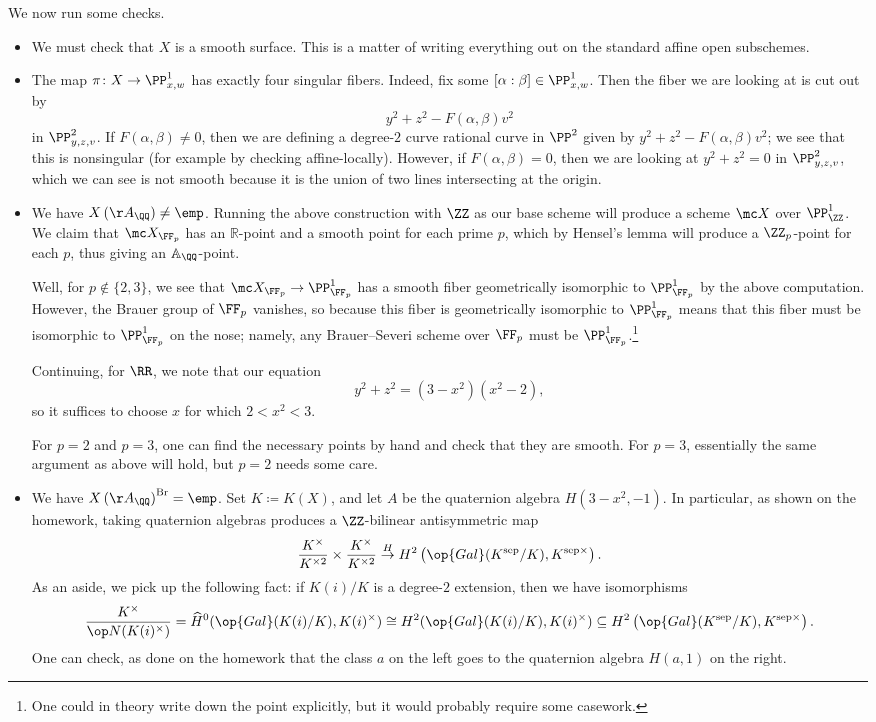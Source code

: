 \documentclass[../notes.tex]{subfiles}
\begin{document}
We now run some checks.
\begin{itemize}
	\item We must check that $X$ is a smooth surface. This is a matter of writing everything out on the standard affine open subschemes.
	\item The map $\pi\colon X\to\PP^1_{x,w}$ has exactly four singular fibers. Indeed, fix some $[\alpha:\beta]\in\PP^1_{x,w}$. Then the fiber we are looking at is cut out by
	\[y^2+z^2-F(\alpha,\beta)v^2\]
	in $\PP^2_{y,z,v}$. If $F(\alpha,\beta)\ne0$, then we are defining a degree-$2$ curve rational curve in $\PP^2$ given by $y^2+z^2-F(\alpha,\beta)v^2$; we see that this is nonsingular (for example by checking affine-locally). However, if $F(\alpha,\beta)=0$, then we are looking at $y^2+z^2=0$ in $\PP^2_{y,z,v}$, which we can see is not smooth because it is the union of two lines intersecting at the origin.
	\item We have $X\left(\AA_\QQ\right)\ne\emp$. Running the above construction with $\ZZ$ as our base scheme will produce a scheme $\mc X$ over $\PP^1_\ZZ$. We claim that $\mc X_{\FF_p}$ has an $\mathbb R$-point and a smooth point for each prime $p$, which by Hensel's lemma will produce a $\ZZ_p$-point for each $p$, thus giving an $\mathbb A_\QQ$-point.

	Well, for $p\notin\{2,3\}$, we see that $\mc X_{\FF_p}\to\PP^1_{\FF_p}$ has a smooth fiber geometrically isomorphic to $\PP^1_{\FF_p}$ by the above computation. However, the Brauer group of $\FF_p$ vanishes, so because this fiber is geometrically isomorphic to $\PP^1_{\FF_p}$ means that this fiber must be isomorphic to $\PP^1_{\FF_p}$ on the nose; namely, any Brauer--Severi scheme over $\FF_p$ must be $\PP^1_{\FF_p}$.\footnote{One could in theory write down the point explicitly, but it would probably require some casework.}

	Continuing, for $\RR$, we note that our equation
	\[y^2+z^2=\left(3-x^2\right)\left(x^2-2\right),\]
	so it suffices to choose $x$ for which $2<x^2<3$.

	For $p=2$ and $p=3$, one can find the necessary points by hand and check that they are smooth. For $p=3$, essentially the same argument as above will hold, but $p=2$ needs some care.

	\item We have $X\left(\AA_\QQ\right)^{\mathrm{Br}}=\emp$. Set $K\coloneqq K(X)$, and let $A$ be the quaternion algebra $H\left(3-x^2,-1\right)$. In particular, as shown on the homework, taking quaternion algebras produces a $\ZZ$-bilinear antisymmetric map
	\[\frac{K^\times}{K^{\times2}}\times\frac{K^\times}{K^{\times2}}\stackrel H\to H^2\left(\op{Gal}(K^{\mathrm{sep}}/K),K^{\mathrm{sep}\times}\right).\]
	As an aside, we pick up the following fact: if $K(i)/K$ is a degree-$2$ extension, then we have isomorphisms
	\[\frac{K^\times}{\op N(K(i)^\times)}=\widehat H^0(\op{Gal}(K(i)/K),K(i)^\times)\cong H^2(\op{Gal}(K(i)/K),K(i)^\times)\subseteq H^2\left(\op{Gal}(K^{\mathrm{sep}}/K),K^{\mathrm{sep}\times}\right).\]
	One can check, as done on the homework that the class $a$ on the left goes to the quaternion algebra $H(a,1)$ on the right.


\end{itemize}
\end{document}
